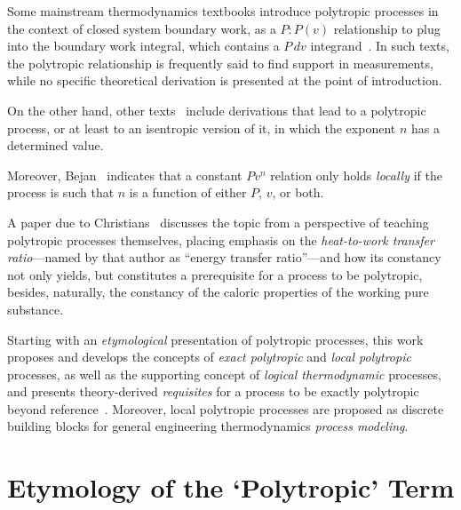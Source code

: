\documentclass[fleqn,11pt]{SelfArx}
\begin{document}
    Some mainstream thermodynamics textbooks introduce polytropic processes in  the  context  of
    closed system boundary work, as a $P\!:\!P(v)$ relationship to plug into the  boundary  work
    integral,   which    contains    a    $P\,dv$    integrand~\cite{2013-CengelYA+BolesMA-AMGH,
    2002-MoranMJ+ShapiroHN-LTC, 1985-WylenG-Wiley}. In such texts, the  polytropic  relationship
    is frequently said to find support in measurements, while no specific theoretical derivation
    is presented at the point of introduction.

    On  the  other  hand,  other  texts~\cite{1986-JonesJB+HawkinsGA-Wiley,   2006-BejanA-Wiley,
    2015-KroosKA+PotterMC-Cengage} include derivations that lead to a polytropic process, or  at
    least to an isentropic version of it, in which the exponent $n$ has a determined value.

    Moreover, Bejan~\cite[p.~175]{2006-BejanA-Wiley} indicates that a constant  $Pv^n$  relation
    only holds \emph{locally} if the process is such that $n$ is a function of either $P$,  $v$,
    or both.

    A paper due to Christians~\cite{2012-ChristiansJ-IntJMechEngEduc} discusses the topic from a
    perspective  of  teaching  polytropic  processes  themselves,  placing   emphasis   on   the
    \emph{heat-to-work transfer ratio}---named by that author as ``energy transfer ratio''---and
    how its constancy not only yields, but constitutes  a  prerequisite  for  a  process  to  be
    polytropic, besides, naturally, the constancy of the caloric properties of the working  pure
    substance.

    Starting with  an  \emph{etymological}  presentation  of  polytropic  processes,  this  work
    proposes and develops the concepts of \emph{exact polytropic}  and  \emph{local  polytropic}
    processes, as well as the supporting concept of \emph{logical thermodynamic} processes,  and
    presents theory-derived \emph{requisites} for a process  to  be  exactly  polytropic  beyond
    reference~\cite{2012-ChristiansJ-IntJMechEngEduc}. Moreover, local polytropic processes  are
    proposed as discrete building blocks for general  engineering  thermodynamics  \emph{process
    modeling}.

\section{Etymology of the `Polytropic' Term}\label{sec:etymology}
\end{document}
